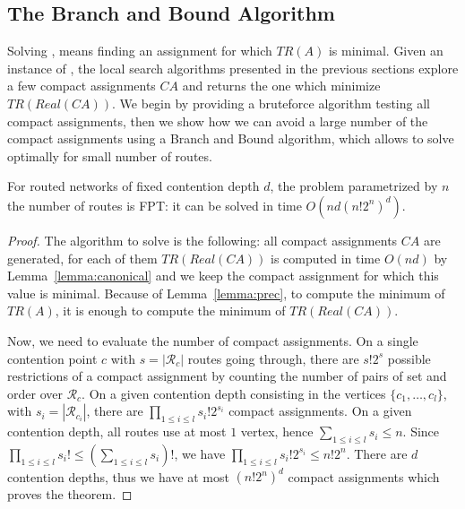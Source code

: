 

\subsection{The Branch and Bound Algorithm}\label{sec:branchBound}


Solving \spall, means finding an assignment for which $TR(A)$ is minimal. 
Given an instance of \spall, the local search algorithms presented in the previous sections explore a few compact assignments $CA$ and returns the one which minimize $TR(Real(CA))$.  We begin by providing 
a bruteforce algorithm testing all compact assignments, then we show how we can avoid a large number of the compact assignments using a Branch and Bound algorithm, which allows to solve \spall optimally for small number of routes.

\begin{theorem}\label{theorem:FPT}
For routed networks of fixed contention depth $d$, the problem \spall parametrized by $n$ the number of routes is FPT: it can be solved in time $O(nd(n!2^{n})^{d})$.
\end{theorem}
\begin{proof}
The algorithm to solve \spall is the following: all compact assignments $CA$ are generated, for each of them $TR(Real(CA))$ is computed in time $O(nd)$ by Lemma~\ref{lemma:canonical} and we keep the compact assignment for which this value is minimal.  Because of Lemma~\ref{lemma:prec}, to compute the minimum of $TR(A)$, it is enough 
to compute the minimum of $TR(Real(CA))$.

 Now, we need to evaluate the number of compact assignments. 
On a single contention point $c$ with $s = |\mathcal{R}_c|$ routes going through, there are $s!2^s$ possible restrictions of a compact assignment by counting the number of pairs of set and order over $\mathcal{R}_c$.
On a given contention depth consisting in the vertices $\{c_1,\dots,c_l\}$, with $s_i = |\mathcal{R}_{c_{i}}|$, there are 
$\prod_{1 \leq i\leq l} s_i!2^{s_i}$ compact assignments. On a given contention depth, all routes use at most $1$ vertex, hence $\sum_{1 \leq i\leq l} s_i \leq n$. Since $\prod_{1 \leq i\leq l} s_i! \leq (\sum_{1 \leq i\leq l} s_i)!$, we have $\prod_{1 \leq i\leq l} s_i!2^{s_i} \leq n!2^n$. There are $d$ contention depths, thus we have at most $ (n!2^{n})^{d}$ compact assignments which proves the theorem.
\end{proof}

